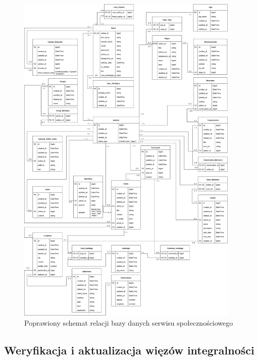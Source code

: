 \documentclass{article}
\begin{document}
\begin{figure}[htbp]
  \begin{center}
    \includegraphics[width=0.95\textwidth]{images/DiagramBazyDanych_8_2.png}
  \end{center}
  \caption{Poprawiony schemat relacji bazy danych serwisu społecznościowego}
  \label{fig:schemat_relacji}
\end{figure}

\subsection{Weryfikacja i aktualizacja więzów integralności}
\end{document}
